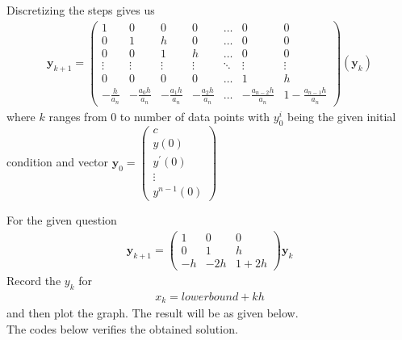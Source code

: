 \documentclass{beamer}
\providecommand{\brak}[1]{\ensuremath{\left(#1\right)}}
\theoremstyle{remark}
\newcommand{\myvec}[1]{\ensuremath{\begin{pmatrix}#1\end{pmatrix}}}
\let\vec\mathbf
\numberwithin{equation}{section}
\begin{document}
\begin{frame}
Discretizing the steps gives us
\begin{align}
	\vec{y}_{k+1} = \myvec{1 & 0 & 0 & 0 & \dots & 0 & 0\\ 0 & 1 & h & 0 & \dots & 0 & 0\\0 & 0 & 1 & h & \dots & 0 & 0\\\vdots & \vdots & \vdots & \vdots& \ddots & \vdots & \vdots\\
	0 & 0 & 0 & 0 & \dots & 1 & h\\-\frac{h}{a_n} & -\frac{a_0h}{a_n} & -\frac{a_1h}{a_n} & -\frac{a_2h}{a_n} & \dots & -\frac{a_{n-2}h}{a_n} & 1-\frac{a_{n-1}h}{a_n}}\brak{\vec{y}_{k}}
\end{align}
where $k$ ranges from 0 to number of data points with $y^{i}_0$ being the given initial condition and vector $\vec{y}_0 = \myvec{c\\y\brak{0}\\y^\prime\brak{0}\\\vdots\\y^{n-1}\brak{0}}$
\end{frame}
\begin{frame}
For the given question\\
\begin{align}
	\vec{y}_{k+1} = \myvec{1 & 0 & 0\\ 0 & 1 & h\\ -h & -2h & 1+2h}\vec{y}_k
\end{align}
Record the $y_k$ for 
\begin{align}
x_k =lowerbound+kh
\end{align}
and then plot the graph. The result will be as given below.\\
The codes below verifies the obtained solution. 
\end{frame}
\end{document}
